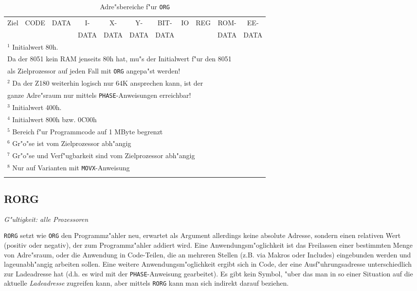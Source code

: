 \documentclass[12pt,a4paper,twoside]{report}
\makeatletter
\newcommand{\tty}[1]{{\tt #1}}
\newcommand{\tin}[1]{{\scriptsize #1}}
\newcommand{\ttindex}[1]{\index{#1@{\tt #1}}}
\makeatother
\begin{document}
\begin{longtable}{|l|c|c|c|c|c|c|c|c|c|c|}
\hline
\tin{Ziel} & \tin{CODE} & \tin{DATA} & \tin{I-}   & \tin{X-}   & \tin{Y-}   & \tin{BIT-} & \tin{IO} & \tin{REG} & \tin{ROM-} & \tin{EE-} \\
           &            &            & \tin{DATA} & \tin{DATA} & \tin{DATA} & \tin{DATA} &          &           & \tin{DATA} & \tin{DATA} \\
\hline
\hline
\endhead

\hline
\multicolumn{11}{|l|}{$^{1}$ Initialwert 80h. } \\
\multicolumn{11}{|l|}{  Da der 8051 kein RAM jenseits 80h hat, mu"s der Initialwert f"ur den 8051} \\
\multicolumn{11}{|l|}{  als Zielprozessor auf jeden Fall mit \tty{ORG} angepa"st werden!} \\
\hline
\multicolumn{11}{|l|}{$^{2}$ Da der Z180 weiterhin logisch nur 64K ansprechen kann, ist der} \\
\multicolumn{11}{|l|}{ganze Adre"sraum nur mittels \tty{PHASE}-Anweisungen erreichbar!} \\
\hline
\multicolumn{11}{|l|}{$^{3}$ Initialwert 400h.} \\
\hline
\multicolumn{11}{|l|}{$^{4}$ Initialwert 800h bzw. 0C00h} \\
\hline
\multicolumn{11}{|l|}{$^{5}$ Bereich f"ur Programmcode auf 1 MByte begrenzt} \\
\hline
\multicolumn{11}{|l|}{$^{6}$ Gr"o"se ist vom Zielprozessor abh"angig} \\
\hline
\multicolumn{11}{|l|}{$^{7}$ Gr"o"se und Verf"ugbarkeit sind vom Zielprozessor abh"angig} \\
\hline
\multicolumn{11}{|l|}{$^{8}$ Nur auf Varianten mit \tty{MOVX}-Anweisung} \\
\hline
\caption{Adre"sbereiche f"ur \tty{ORG}}
\label{TabORG}
\end{longtable}


\subsection{RORG}
\label{SectRORG}
\ttindex{RORG}

{\em G"ultigkeit: alle Prozessoren}

\tty{RORG} setzt wie \tty{ORG} den Programmz"ahler neu, erwartet
als Argument allerdings keine absolute Adresse, sondern einen
relativen Wert (positiv oder negativ), der zum Programmz"ahler
addiert wird.  Eine Anwendungsm"oglichkeit ist das Freilassen
einer bestimmten Menge von Adre"sraum, oder die Anwendung in
Code-Teilen, die an mehreren Stellen (z.B. via Makros oder
Includes) eingebunden werden und lageunabh"angig arbeiten sollen.
Eine weitere Anwendungsm"oglichkeit ergibt sich in Code, der eine
Ausf"uhrungsadresse unterschiedlich zur Ladeadresse hat (d.h. es
wird mit der \tty{PHASE}-Anweisung gearbeitet).  Es gibt kein
Symbol, "uber das man in so einer Situation auf die aktuelle
{\em Ladeadresse} zugreifen kann, aber mittels \tty{RORG} kann man
sich indirekt darauf beziehen.
\end{document}
